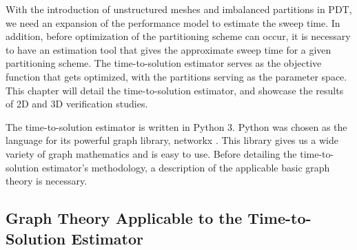 \documentclass[times,final]{elsarticle}
\begin{document}
With the introduction of unstructured meshes and imbalanced partitions in PDT, we need an expansion of the performance model to estimate the sweep time.
In addition, before optimization of the partitioning scheme can occur, it is necessary to have an estimation tool that gives the approximate sweep time for a given partitioning scheme.
The time-to-solution estimator serves as the objective function that gets optimized, with the partitions serving as the parameter space. This chapter will detail the time-to-solution estimator, and showcase the results of 2D and 3D verification studies.

The time-to-solution estimator is written in Python 3. Python was chosen as the language for its powerful graph library, networkx \cite{networkx}.
This library gives us a wide variety of graph mathematics and is easy to use.
Before detailing the time-to-solution estimator's methodology, a description of the applicable basic graph theory is necessary.

\subsection{Graph Theory Applicable to the Time-to-Solution Estimator}
\end{document}
